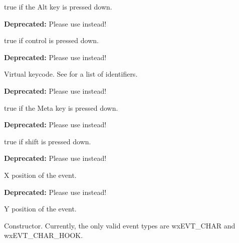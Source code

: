 true if the Alt key is pressed down.


\label{wxkeyeventmcontroldown}


\textbf{Deprecated: } Please use 
instead!

true if control is pressed down.


\label{wxkeyeventmkeycode}


\textbf{Deprecated: } Please use 
instead!

Virtual keycode. See  for a list of identifiers.


\label{wxkeyeventmmetadown}


\textbf{Deprecated: } Please use 
instead!

true if the Meta key is pressed down.


\label{wxkeyeventmshiftdown}


\textbf{Deprecated: } Please use 
instead!

true if shift is pressed down.


\label{wxkeyeventmx}


\textbf{Deprecated: } Please use  instead!

X position of the event.


\label{wxkeyeventmy}


\textbf{Deprecated: } Please use  instead!

Y position of the event.


\label{wxkeyeventctor}


Constructor. Currently, the only valid event types are wxEVT\_CHAR and wxEVT\_CHAR\_HOOK.


